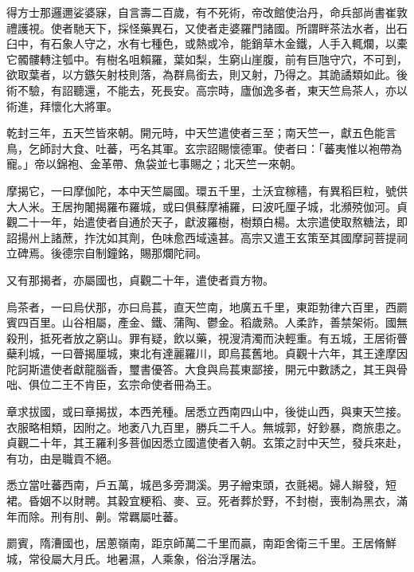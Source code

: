 \begin{pinyinscope}
 得方士那邏邇娑婆寐，自言壽二百歲，有不死術，帝改館使治丹，命兵部尚書崔敦禮護視。使者馳天下，採怪藥異石，又使者走婆羅門諸國。所謂畔茶法水者，出石臼中，有石象人守之，水有七種色，或熱或冷，能銷草木金鐵，人手入輒爛，以橐它髑髏轉注瓠中。有樹名咀賴羅，葉如梨，生窮山崖腹，前有巨虺守穴，不可到，欲取葉者，以方鏃矢射枝則落，為群鳥銜去，則又射，乃得之。其詭譎類如此。後術不驗，有詔聽還，不能去，死長安。高宗時，廬伽逸多者，東天竺烏茶人，亦以術進，拜懷化大將軍。



 乾封三年，五天竺皆來朝。開元時，中天竺遣使者三至；南天竺一，獻五色能言鳥，乞師討大食、吐蕃，丐名其軍。玄宗詔賜懷德軍。使者曰：「蕃夷惟以袍帶為寵。」帝以錦袍、金革帶、魚袋並七事賜之；北天竺一來朝。



 摩揭它，一曰摩伽陀，本中天竺屬國。環五千里，土沃宜稼穡，有異稻巨粒，號供大人米。王居拘闍揭羅布羅城，或曰俱蘇摩補羅，曰波吒厘子城，北瀕殑伽河。貞觀二十一年，始遣使者自通於天子，獻波羅樹，樹類白楊。太宗遣使取熬糖法，即詔揚州上諸蔗，拃沈如其劑，色味愈西域遠甚。高宗又遣王玄策至其國摩訶菩提祠立碑焉。後德宗自制鐘銘，賜那爛陀祠。



 又有那揭者，亦屬國也，貞觀二十年，遣使者貢方物。



 烏茶者，一曰烏伏那，亦曰烏萇，直天竺南，地廣五千里，東距勃律六百里，西罽賓四百里。山谷相屬，產金、鐵、蒲陶、鬱金。稻歲熟。人柔詐，善禁架術。國無殺刑，抵死者放之窮山。罪有疑，飲以藥，視溲清濁而決輕重。有五城，王居術瞢蘗利城，一曰瞢揭厘城，東北有達麗羅川，即烏萇舊地。貞觀十六年，其王達摩因陀訶斯遣使者獻龍腦香，璽書優答。大食與烏萇東鄙接，開元中數誘之，其王與骨咄、俱位二王不肯臣，玄宗命使者冊為王。



 章求拔國，或曰章揭拔，本西羌種。居悉立西南四山中，後徙山西，與東天竺接。衣服略相類，因附之。地袤八九百里，勝兵二千人。無城郭，好鈔暴，商旅患之。貞觀二十年，其王羅利多菩伽因悉立國遣使者入朝。玄策之討中天竺，發兵來赴，有功，由是職貢不絕。



 悉立當吐蕃西南，戶五萬，城邑多旁澗溪。男子繒束頭，衣氈褐。婦人辮發，短裙。昏姻不以財聘。其穀宜粳稻、麥、豆。死者葬於野，不封樹，喪制為黑衣，滿年而除。刑有刖、劓。常羈屬吐蕃。



 罽賓，隋漕國也，居蔥嶺南，距京師萬二千里而贏，南距舍衛三千里。王居脩鮮城，常役屬大月氏。地暑濕，人乘象，俗治浮屠法。




\end{pinyinscope}
